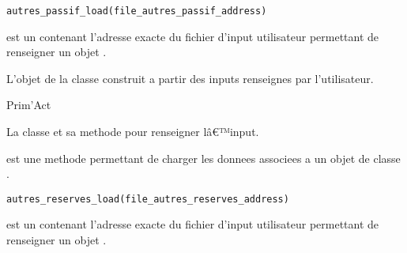 \documentclass[a4paper]{book}
\begin{document}
%
\begin{Usage}
\begin{verbatim}
autres_passif_load(file_autres_passif_address)
\end{verbatim}
\end{Usage}
%
\begin{Arguments}
\begin{ldescription}
\item[\code{file\_autres\_passif\_address}] est un  contenant l'adresse exacte
du fichier d'input utilisateur
permettant de renseigner un objet .
\end{ldescription}
\end{Arguments}
%
\begin{Value}
L'objet de la classe  construit a partir des inputs renseignes par l'utilisateur.
\end{Value}
%
\begin{Author}\relax
Prim'Act
\end{Author}
%
\begin{SeeAlso}\relax
La classe  et sa methode 
pour renseigner lâ€™input.
\end{SeeAlso}
%
\begin{Description}\relax
{} est une methode permettant de charger les donnees associees a un
objet de classe .
\end{Description}
%
\begin{Usage}
\begin{verbatim}
autres_reserves_load(file_autres_reserves_address)
\end{verbatim}
\end{Usage}
%
\begin{Arguments}
\begin{ldescription}
\item[\code{file\_autres\_reserves\_address}] est un  contenant l'adresse exacte
du fichier d'input utilisateur
permettant de renseigner un objet .
\end{ldescription}
\end{Arguments}
\end{document}
